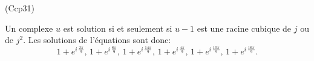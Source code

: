 \begin{tiny}(Ccp31)\end{tiny} Un complexe $u$ est solution si et seulement si $u-1$ est une racine cubique de $j$ ou de $j^2$. Les solutions de l'équations sont donc:
\[
  1+e^{i\, \frac{2\pi}{9}},\, 1+e^{i\, \frac{8\pi}{9}},\, 1+e^{i\, \frac{14\pi}{9}},\, 1+e^{i\, \frac{4\pi}{9}},\, 1+e^{i\, \frac{10\pi}{9}},\, 1+e^{i\, \frac{16\pi}{9}}.
\]
